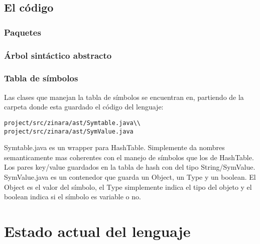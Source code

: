 \documentclass[12pt, spanish]{report}
\begin{document}
\section{El código}
\label{sec:codigo}

\subsection{Paquetes}
\label{sec:paquetes}

\subsection{Árbol sintáctico abstracto}
\label{sec:ast}

\subsection{Tabla de símbolos}
\label{sec:st}
Las clases que manejan la tabla de s\'imbolos se encuentran en,
partiendo de la carpeta donde esta guardado el c\'odigo del lenguaje:
\begin{verbatim}
project/src/zinara/ast/Symtable.java\\
project/src/zinara/ast/SymValue.java
\end{verbatim}
\indent Symtable.java es un wrapper para HashTable. Simplemente da
nombres semanticamente mas coherentes con el manejo de s\'imbolos que
los de HashTable. Los pares key/value guardados en la tabla de hash con
del tipo String/SymValue.\\
\indent SymValue.java es un contenedor que guarda un Object, un Type y
un boolean. El Object es el valor del s\'imbolo, el Type simplemente
indica el tipo del objeto y el boolean indica si el s\'imbolo es
variable o no. 

\chapter{Estado actual del lenguaje}
\label{chap:estado}
\end{document}
